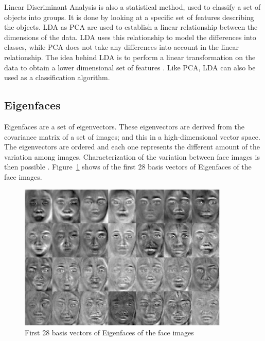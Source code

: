\vspace{\baselineskip}
\noindent Linear Discriminant Analysis is also a statistical method, used to classify a set of objects into groups. It is done by looking at a specific set of features describing the objects. LDA as PCA are used to establish a linear relationship between the dimensions of the data. LDA uses this relationship to model the differences into classes, while PCA does not take any differences into account in the linear relationship. The idea behind LDA  is to perform a linear transformation on the data to obtain a lower dimensional set of features \cite{GAN08}. Like PCA, LDA can also be used as a classification algorithm.
\newline

\subsection{Eigenfaces}

\vspace{\baselineskip}
\noindent Eigenfaces are a set of eigenvectors. These eigenvectors are derived from the covariance matrix of a set of images; and this in a high-dimensional vector space. The eigenvectors are ordered and each one represents the different amount of the variation among images. Characterization of the variation between face images is then possible \cite{TUR91}. Figure~\ref{eigenface_example} shows of the first 28 basis vectors of Eigenfaces of the face images.
\newline

\begin{figure}[!h]
\begin{center}
\noindent \includegraphics[scale=1]{figures/eigenface_example} 
\newline
\caption{First 28 basis vectors of Eigenfaces of the face images}
\label{eigenface_example}
\end{center} 
\end{figure}

